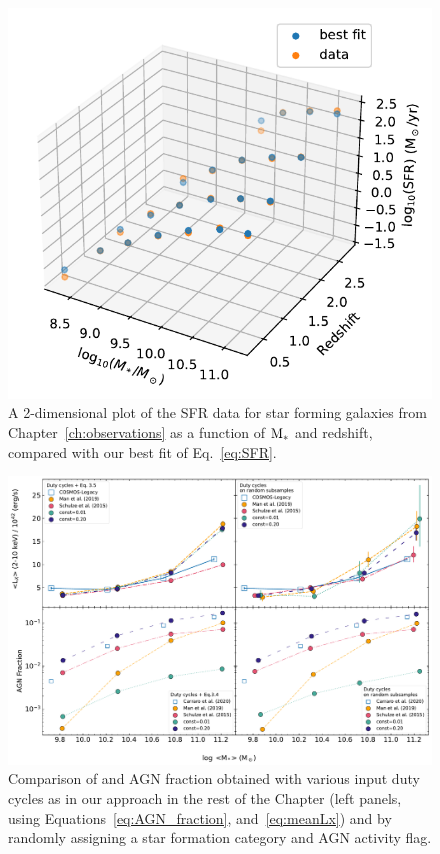 \begin{figure}
\begin{center}
  \includegraphics[width=0.65\linewidth]{Figs/Chapter3/2D_SFR_fit_data.pdf}
  \caption{A 2-dimensional plot of the SFR data for star forming galaxies from Chapter~\ref{ch:observations} as a function of ${\rm M}_*$ and redshift, compared with our best fit of Eq.~\ref{eq:SFR}.
  }
    \label{fig:SFR_2D_fit}
\end{center}
\end{figure}

\begin{figure}
\begin{center}
  \includegraphics[width=\linewidth]{Figs/Chapter3/test_mean_subsamples.pdf}
  \caption{Comparison of \LX{} and AGN fraction obtained with various input duty cycles as in our approach in the rest of the Chapter (left panels, using Equations~\ref{eq:AGN_fraction}, and~\ref{eq:meanLx}) and by randomly assigning a star formation category and AGN activity flag.
  }
    \label{fig:test_subsamples}
\end{center}
\end{figure}


